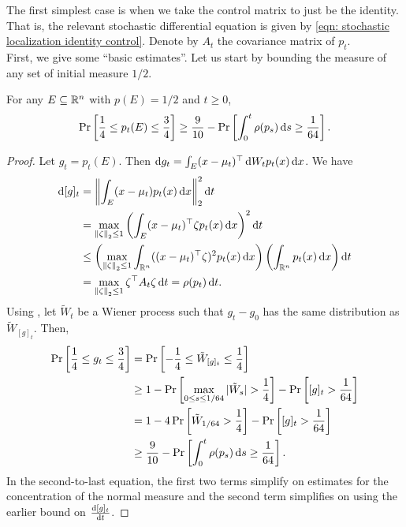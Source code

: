 		The first simplest case is when we take the control matrix to just be the identity. That is, the relevant stochastic differential equation is given by \eqref{eqn: stochastic localization identity control}. Denote by $A_t$ the covariance matrix of $p_t$.\\


		First, we give some ``basic estimates''. Let us start by bounding the measure of any set of initial measure $1/2$.

		\begin{lemma}
			For any $E\subseteq\mathbb{R}^n$ with $p(E) = 1/2$ and $t \geq 0$,
			\[ \Pr\left[\frac{1}{4} \leq p_t(E) \leq \frac{3}{4} \right] \geq \frac{9}{10} - \Pr\left[\int_0^t \rho(p_s)\operatorname{d}\!{s} \geq \frac{1}{64}\right]. \]
		\end{lemma}
		\begin{proof}
			Let $g_t = p_t(E)$. Then $\operatorname{d}\!{g}_t = \int_E (x-\mu_t)^\top \operatorname{d}\!{W}_t p_t(x) \operatorname{d}\!{x}$. We have
			\begin{align*}
				\d{[g]_t} &= \norm{\int_E (x-\mu_t)p_t(x) \d{x}}_2^2 \d{t} \\
					&= \max_{\norm{\zeta}_2 \leq 1} \left(\int_E (x-\mu_t)^\top\zeta p_t(x) \d{x}\right)^2 \d{t} \\
					&\leq \left(\max_{\norm{\zeta}_2 \leq 1} \int_{\Rn} ((x-\mu_t)^\top\zeta)^2 p_t(x) \d{x}\right) \left(\int_{\Rn} p_t(x)\d{x}\right) \d{t} \\
					&= \max_{\norm{\zeta}_2 \leq 1} \zeta^\top A_t \zeta \d{t} = \rho(p_t)\d{t}.
			\end{align*}
			Using , let $\tilde{W}_t$ be a Wiener process such that $g_t - g_0$ has the same distribution as $\tilde{W}_{[g]_t}$. Then,
			\begin{align*}
				\Pr\left[\frac{1}{4} \leq g_t \leq \frac{3}{4}\right] &= \Pr\left[-\frac{1}{4} \leq \tilde{W}_{[g]_t} \leq \frac{1}{4}\right] \\
					&\geq 1 - \Pr\left[\max_{0 \leq s \leq 1/64} |\tilde{W}_s| > \frac{1}{4}\right] - \Pr\left[[g]_t > \frac{1}{64}\right] \\
					&= 1 - 4\Pr\left[\tilde{W}_{1/64} > \frac{1}{4}\right] - \Pr\left[[g]_t > \frac{1}{64}\right] \\
					&\geq \frac{9}{10} - \Pr\left[\int_0^t \rho(p_s) \operatorname{d}\!{s} \geq \frac{1}{64}\right].
			\end{align*}
			In the second-to-last equation, the first two terms simplify on estimates for the concentration of the normal measure and the second term simplifies on using the earlier bound on $\frac{\operatorname{d}\!{[g]_t}}{\operatorname{d}\!{t}}$.
		\end{proof}

